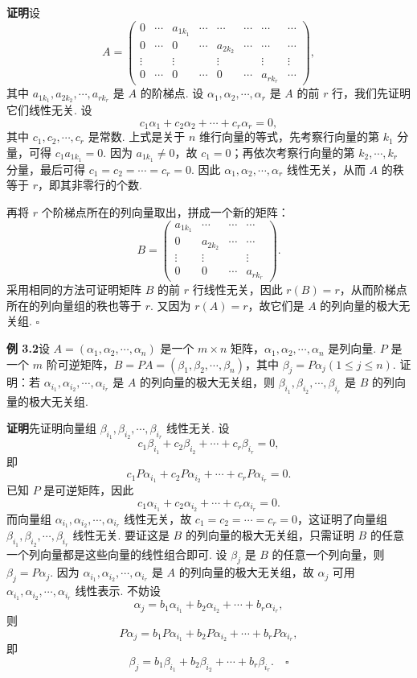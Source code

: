 \documentclass[UTF8, 12pt, fontset=fandol, oneside]{ctexart}
\begin{document}
\noindent\textbf{证明}\quad 设
\[
A=
\begin{pmatrix}
0 & \cdots & a_{1k_1} & \cdots & \cdots & \cdots & \cdots & \cdots\\
0 & \cdots & 0 & \cdots & a_{2k_2} & \cdots & \cdots & \cdots\\
\vdots &        & \vdots &        & \vdots &        & \vdots & \vdots\\
0 & \cdots & 0 & \cdots & 0 & \cdots & a_{rk_r} & \cdots
\end{pmatrix},
\]
其中 $a_{1k_1},a_{2k_2},\cdots,a_{rk_r}$ 是 $A$ 的阶梯点. 设 $\alpha_1,\alpha_2,\cdots,\alpha_r$ 是 $A$ 的前 $r$ 行，我们先证明它们线性无关. 设
\[
c_1\alpha_1+c_2\alpha_2+\cdots+c_r\alpha_r=0,
\]
其中 $c_1,c_2,\cdots,c_r$ 是常数. 上式是关于 $n$ 维行向量的等式，先考察行向量的第 $k_1$ 分量，可得 $c_1a_{1k_1}=0$. 因为 $a_{1k_1}\ne 0$，故 $c_1=0$；再依次考察行向量的第 $k_2,\cdots,k_r$ 分量，最后可得 $c_1=c_2=\cdots=c_r=0$. 因此 $\alpha_1,\alpha_2,\cdots,\alpha_r$ 线性无关，从而 $A$ 的秩等于 $r$，即其非零行的个数.

再将 $r$ 个阶梯点所在的列向量取出，拼成一个新的矩阵：
\[
B=
\begin{pmatrix}
a_{1k_1} & \cdots & \cdots & \cdots\\
0 & a_{2k_2} & \cdots & \cdots\\
\vdots & \vdots &        & \vdots\\
0 & 0 & \cdots & a_{rk_r}
\end{pmatrix}.
\]
采用相同的方法可证明矩阵 $B$ 的前 $r$ 行线性无关，因此 $r(B)=r$，从而阶梯点所在的列向量组的秩也等于 $r$. 又因为 $r(A)=r$，故它们是 $A$ 的列向量的极大无关组. $\square$

\noindent\textbf{例 3.2}\quad 设 $A=(\alpha_1,\alpha_2,\cdots,\alpha_n)$ 是一个 $m\times n$ 矩阵，$\alpha_1,\alpha_2,\cdots,\alpha_n$ 是列向量. $P$ 是一个 $m$ 阶可逆矩阵，$B=PA=(\beta_1,\beta_2,\cdots,\beta_n)$，其中 $\beta_j=P\alpha_j(1\le j\le n)$. 证明：若 $\alpha_{i_1},\alpha_{i_2},\cdots,\alpha_{i_r}$ 是 $A$ 的列向量的极大无关组，则 $\beta_{i_1},\beta_{i_2},\cdots,\beta_{i_r}$ 是 $B$ 的列向量的极大无关组.

\noindent\textbf{证明}\quad 先证明向量组 $\beta_{i_1},\beta_{i_2},\cdots,\beta_{i_r}$ 线性无关. 设
\[
c_1\beta_{i_1}+c_2\beta_{i_2}+\cdots+c_r\beta_{i_r}=0,
\]
即
\[
c_1P\alpha_{i_1}+c_2P\alpha_{i_2}+\cdots+c_rP\alpha_{i_r}=0.
\]
已知 $P$ 是可逆矩阵，因此
\[
c_1\alpha_{i_1}+c_2\alpha_{i_2}+\cdots+c_r\alpha_{i_r}=0.
\]
而向量组 $\alpha_{i_1},\alpha_{i_2},\cdots,\alpha_{i_r}$ 线性无关，故 $c_1=c_2=\cdots=c_r=0$，这证明了向量组 $\beta_{i_1},\beta_{i_2},\cdots,\beta_{i_r}$ 线性无关. 要证这是 $B$ 的列向量的极大无关组，只需证明 $B$ 的任意一个列向量都是这些向量的线性组合即可. 设 $\beta_j$ 是 $B$ 的任意一个列向量，则 $\beta_j=P\alpha_j$. 因为 $\alpha_{i_1},\alpha_{i_2},\cdots,\alpha_{i_r}$ 是 $A$ 的列向量的极大无关组，故 $\alpha_j$ 可用 $\alpha_{i_1},\alpha_{i_2},\cdots,\alpha_{i_r}$ 线性表示. 不妨设
\[
\alpha_j=b_1\alpha_{i_1}+b_2\alpha_{i_2}+\cdots+b_r\alpha_{i_r},
\]
则
\[
P\alpha_j=b_1P\alpha_{i_1}+b_2P\alpha_{i_2}+\cdots+b_rP\alpha_{i_r},
\]
即
\[
\beta_j=b_1\beta_{i_1}+b_2\beta_{i_2}+\cdots+b_r\beta_{i_r}. \quad \square
\]
\end{document}
